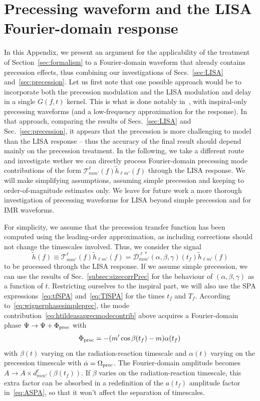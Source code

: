 \documentclass[aps,showpacs,twocolumn,
prd,superscriptaddress,nofootinbib]{revtex4-1}
\newcommand{\be}{\begin{equation}}
\newcommand{\ee}{\end{equation}}
\newcommand\calT{{\mathcal{T}}}
\newcommand\calD{{\mathcal{D}}}
\newcommand{\tf}{t_{f}}
\newcommand{\Tf}{T_{f}}
\begin{document}
\section{Precessing waveform and the LISA Fourier-domain response}
\label{app:precLISA}

In this Appendix, we present an argument for the applicability of the treatment of Section~\ref{sec:formalism} to a Fourier-domain waveform that already contains precession effects, thus combining our investigations of Secs.~\ref{sec:LISA} and~\ref{sec:precession}. Let us first note that one possible approach would be to incorporate both the precession modulation and the LISA modulation and delay in a single $G(f,t)$ kernel. This is what is done notably in~\cite{Klein+15}, with inspiral-only precessing waveforms (and a low-frequency approximation for the response). In that approach, comparing the results of Secs.~\ref{sec:LISA} and Sec.~\ref{sec:precession}, it appears that the precession is more challenging to model than the LISA response -- thus the accuracy of the final result should depend mainly on the precession treatment. In the following, we take a different route and investigate wether we can directly process Fourier-domain precessing mode contributions of the form $\calT^{\ell}_{m m'}(f) \tilde{h}_{\ell m'}(f)$ through the LISA response. We will make simplifying assumptions, assuming simple precession and keeping to order-of-magnitude estimates only. We leave for future work a more thorough investigation of precessing waveforms for LISA beyond simple precession and for IMR waveforms.

For simplicity, we assume that the precession transfer function has been computed using the leading-order approximation, as including corrections should not change the timescales involved. Thus, we consider the signal
\be\label{eq:htildeasaprecmodecontrib}
	\tilde{h} (f) \equiv \calT^{\ell}_{m m'}(f) \tilde{h}_{\ell m'}(f) = \calD^{\ell *}_{m m'}(\alpha, \beta, \gamma)(\tf) \tilde{h}_{\ell m'}(f)
\ee
to be processed through the LISA response. If we assume simple precession, we can use the results of Sec.~\ref{subsec:sizecorrPrec} for the behaviour of $(\alpha, \beta, \gamma)$ as a function of $t$. Restricting ourselves to the inspiral part, we will also use the SPA expressions~\eqref{eq:tfSPA} and~\eqref{eq:TfSPA} for the times $\tf$ and $\Tf$. According to~\eqref{eq:wignerphasesimpleprec}, the mode contribution~\eqref{eq:htildeasaprecmodecontrib} above acquires a Fourier-domain phase $\Psi \rightarrow \Psi + \Phi_{\rm prec}$ with
\be\label{eq:additionalPhiprec}
	\Phi_{\rm prec} = -(m' \cos \beta(\tf) - m) \alpha(\tf) \,
\ee
with $\beta(t)$ varying on the radiation-reaction timescale and $\alpha(t)$ varying on the precession timescale with $\dot{\alpha} = \Omega_{\rm prec}$. The Fourier-domain amplitude becomes $A\rightarrow A \times d^{\ell}_{mm'} (\beta(\tf))$. If $\beta$ varies on the radiation-reaction timescale, this extra factor can be absorbed in a redefinition of the $a(\tf)$ amplitude factor in~\eqref{eq:ASPA}, so that it won't affect the separation of timescales.
\end{document}
